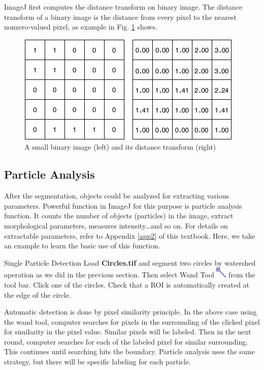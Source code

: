 ImageJ first computes the distance transform on binary image. The distance transform of
a binary image is the distance from every pixel to the nearest nonzero-valued pixel, as example in Fig. \ref{fig:img118} shows.
\begin{figure}[htbp]
\begin{center}
\includegraphics[width=10.85cm,height=5.242cm]{fig/CMCIBasicCourse201102-img118.png}
\caption{ A small binary image (left) and its distance transform (right)}
\label{fig:img118}
\end{center}
\end{figure}


\subsection{Particle Analysis}

After the segmentation, objects could be analyzed for extracting various
parameters. Powerful function in ImageJ for this purpose is particle
analysis function. It counts the number of objects (particles) in the
image, extract morphological parameters, measures intensity\ldots and
so on. For details on extractable parameters, refer to Appendix
\ref{app2} of this textbook. Here, we take an example to learn the basic use of
this function.  

\begin{indentexercise}{1}
Single Particle Detection
Load \textbf{Circles.tif} and segment two circles by watershed operation
as we did in the previous section. Then select Wand Tool 
\includegraphics[width=0.5cm]{fig/CMCIBasicCourse201102-img119.png}
 from the tool bar. Click one of the circles. Check that a ROI is
automatically created at the edge of the circle.
\end{indentexercise}

Automatic detection is done by pixel similarity principle. In the above
case using the wand tool, computer searches for pixels in the
surrounding of the clicked pixel for similarity in the pixel value.
Similar pixels will be labeled. Then in the next round, computer
searches for each of the labeled pixel for similar surrounding. This
continues until searching hits the boundary. Particle analysis uses the
same strategy, but there will be specific labeling for each particle.

